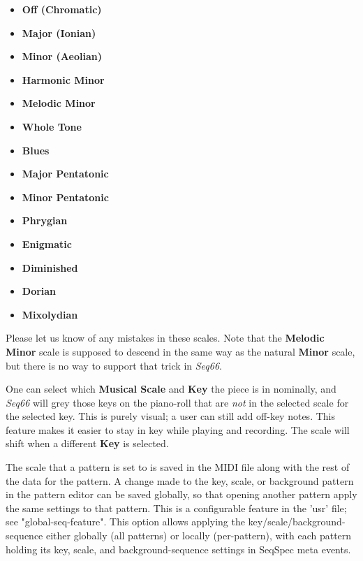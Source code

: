    \begin{itemize}
      \item \textbf{Off (Chromatic)}
      \item \textbf{Major (Ionian)}
      \item \textbf{Minor (Aeolian)}
      \item \textbf{Harmonic Minor}
      \item \textbf{Melodic Minor}
      \item \textbf{Whole Tone}
      \item \textbf{Blues}
      \item \textbf{Major Pentatonic}
      \item \textbf{Minor Pentatonic}
      \item \textbf{Phrygian}
      \item \textbf{Enigmatic}
      \item \textbf{Diminished}
      \item \textbf{Dorian}
      \item \textbf{Mixolydian}
   \end{itemize}

   Please let us know of any mistakes in these scales.
   Note that the \textbf{Melodic Minor} scale is supposed to
   descend in the same way as the natural \textbf{Minor} scale, but
   there is no way to support that trick in \textsl{Seq66}.

   One can select which \textbf{Musical Scale} and
   \textbf{Key} the piece is in nominally,
   and \textsl{Seq66} will grey those keys on the piano-roll that
   are \textsl{not} in the selected scale for the selected key.
   This is purely visual; a user can still add off-key notes.
   This feature makes it easier to stay in key while playing and recording.
   The scale will shift when a different \textbf{Key} is selected.

   The scale that a pattern is set to is
   saved in the MIDI file along with the rest of the data for the pattern.
   A change made to the key, scale, or background pattern in
   the pattern editor can be saved globally, so that opening another pattern
   apply the same settings to that pattern.  This is a configurable feature in
   the 'usr' file; see "global-seq-feature".
   This option allows applying the key/scale/background-sequence
   either globally (all patterns) or locally (per-pattern), with each pattern
   holding its key, scale, and background-sequence settings in
   SeqSpec meta events.

